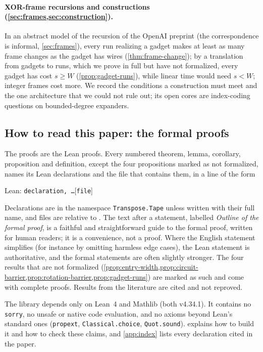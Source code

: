 \paragraph{XOR-frame recursions and constructions (\cref{sec:frames,sec:construction}).} In an abstract model of the recursion of the
OpenAI preprint (the correspondence is informal, \cref{sec:frames}), every run realizing a gadget makes at least as many frame changes as the gadget has wires (\cref{thm:frame-change}); by a translation from gadgets to runs, which we prove in full but have not formalized, every gadget has cost $s\ge W$ (\cref{prop:gadget-runs}), while linear time would need $s<W$; integer frames cost more. We record the conditions a construction must meet and the one architecture that we could not rule out; its open
cores are index-coding questions on bounded-degree expanders.

\subsection{How to read this paper: the formal proofs}

The proofs are the Lean proofs. Every numbered theorem, lemma, corollary, proposition and definition, except the four propositions marked as not formalized, names its Lean declarations and the file that contains them, in a line of the form
\begin{center}
{\small\textsf{Lean:} \texttt{declaration, \dots}\hfill[\texttt{file}]}
\end{center}
Declarations are in the namespace \texttt{Transpose.Tape} unless written with their full name, and files are relative to
. The text after a statement, labelled \emph{Outline of the formal proof}, is a faithful and
straightforward guide to the formal proof, written for human readers; it is a convenience, not a proof. Where the
English statement simplifies (for instance by omitting harmless edge cases), the Lean statement is authoritative, and
the formal statements are often slightly stronger. The four results that are not formalized (\cref{prop:entry-width,prop:circuit-barrier,prop:rotation-barrier,prop:gadget-runs}) are marked as such and come with complete proofs. Results from the
literature are cited and not reproved.

The library depends only on Lean~4 and Mathlib (both v4.34.1). It contains no \texttt{sorry}, no unsafe or native code
evaluation, and no axioms beyond Lean's standard ones (\texttt{propext}, \texttt{Classical.choice}, \texttt{Quot.sound}).
 explains how to build it and how to check these claims, and \cref{app:index} lists every declaration
cited in the paper.

